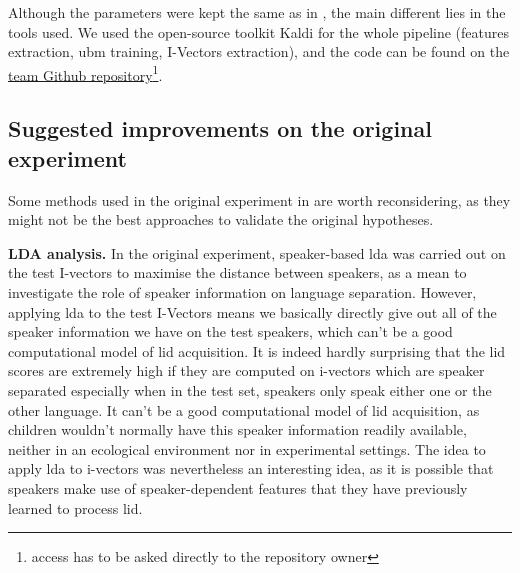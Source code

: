 Although the parameters were kept the same as in \citet{carbajal2016language}, the main different lies in the tools used. We used the open-source toolkit Kaldi \citep{Povey_ASRU2011} for the whole pipeline (features extraction, \acrshort{ubm} training, I-Vectors extraction), and the code can be found on the \href{https://gitlab.coml.lscp.ens.fr/mde/lid.git}{team Github repository}\footnote{access has to be asked directly to the repository owner}.

\bigskip
{}

\bigskip
{}



\subsection{Suggested improvements on the original experiment}\label{Section: improvement on carbajal}


Some methods used in the original experiment in \citet{carbajal2016language} are worth reconsidering, as they might not be the best approaches to validate the original hypotheses. 

\bigskip 

\par \noindent \textbf{LDA analysis.} In the original experiment, speaker-based \acrshort{lda} was carried out on the test I-vectors to maximise the distance between speakers, as a mean to investigate the role of speaker information on language separation. However, applying \acrshort{lda} to the test I-Vectors means we basically directly give out all of the speaker information we have on the test speakers, which can't be a good computational model of \acrshort{lid} acquisition. It is indeed hardly surprising that the \acrshort{lid} scores are extremely high if they are computed on i-vectors which are speaker separated especially when in the test set, speakers only speak either one or the other language. It can't be  a good computational model of \acrshort{lid} acquisition, as children wouldn't normally have this speaker information readily available, neither in an ecological environment nor in experimental settings. The idea to apply \acrshort{lda} to i-vectors was nevertheless an interesting idea, as it is possible that speakers make use of speaker-dependent features that they have previously learned to process \acrshort{lid}. 

